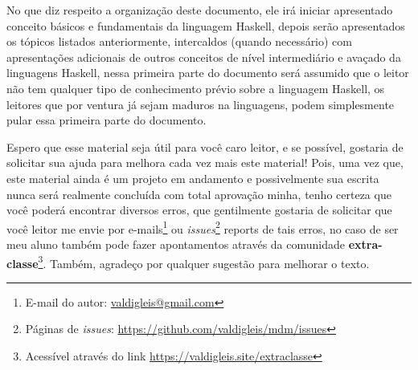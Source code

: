No que diz respeito a organização deste documento, ele irá iniciar apresentado conceito básicos e fundamentais da linguagem Haskell, depois serão apresentados os tópicos listados anteriormente, intercaldos (quando necessário) com apresentações adicionais de outros conceitos de nível intermediário e avaçado da linguagens Haskell, nessa primeira parte do documento será assumido que o leitor não tem qualquer tipo de conhecimento prévio sobre a linguagem Haskell, os leitores que por ventura já sejam maduros na linguagens, podem simplesmente pular essa primeira parte do documento.


Espero que esse material seja útil para você caro leitor, e se possível, gostaria de solicitar sua ajuda para melhora cada vez mais este material! Pois, uma vez que, este material ainda é um projeto em andamento e possivelmente sua escrita nunca será realmente concluída com total aprovação minha, tenho certeza que você poderá encontrar diversos erros, que gentilmente gostaria de solicitar que você leitor me envie por e-mails\footnote{E-mail do autor: \url{valdigleis@gmail.com}} ou \textit{issues}\footnote{Páginas de \textit{issues}: \url{https://github.com/valdigleis/mdm/issues}} reports de tais erros, no caso de ser meu aluno também pode fazer apontamentos através da comunidade \textbf{extra-classe}\footnote{Acessível através do link \url{https://valdigleis.site/extraclasse}}. Também, agradeço por qualquer sugestão para melhorar o texto.



\endgroup
\newpage
